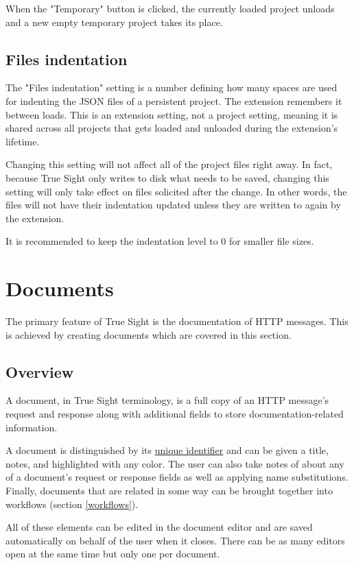\documentclass{article}
\begin{document}
When the "Temporary" button is clicked, the currently loaded project unloads and a new empty temporary project takes its place.

\subsection{Files indentation}

The "Files indentation" setting is a number defining how many spaces are used for indenting the JSON files of a persistent project. The extension remembers it between loads. This is an extension setting, not a project setting, meaning it is shared across all projects that gets loaded and unloaded during the extension's lifetime.

Changing this setting will not affect all of the project files right away. In fact, because True Sight only writes to disk what needs to be saved, changing this setting will only take effect on files solicited after the change. In other words, the files will not have their indentation updated unless they are written to again by the extension.

It is recommended to keep the indentation level to 0 for smaller file sizes.

\section{Documents}

The primary feature of True Sight is the documentation of HTTP messages. This is achieved by creating documents which are covered in this section.

\subsection{Overview}

A document, in True Sight terminology, is a full copy of an HTTP message's request and response along with additional fields to store documentation-related information. 

A document is distinguished by its \href{https://en.wikipedia.org/wiki/Universally_unique_identifier}{unique identifier} and can be given a title, notes, and highlighted with any color. The user can also take notes of about any of a document's request or response fields as well as applying name substitutions. Finally, documents that are related in some way can be brought together into workflows (section \ref{workflows}).

All of these elements can be edited in the document editor and are saved automatically on behalf of the user when it closes. There can be as many editors open at the same time but only one per document.
\end{document}
